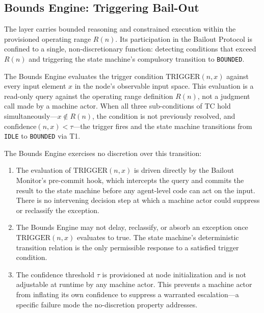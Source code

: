 \subsection{Bounds Engine: Triggering Bail-Out}\label{sec:bounds-trigger}

The \bounds{} layer carries bounded reasoning and constrained execution within the provisioned operating range $R(n)$. Its participation in the Bailout Protocol is confined to a single, non-discretionary function: detecting conditions that exceed $R(n)$ and triggering the state machine's compulsory transition to \texttt{BOUNDED}.

The Bounds Engine evaluates the trigger condition $\text{TRIGGER}(n, x)$ against every input element $x$ in the node's observable input space. This evaluation is a read-only query against the operating range definition $R(n)$, not a judgment call made by a machine actor. When all three sub-conditions of TC hold simultaneously---$x \notin R(n)$, the condition is not previously resolved, and $\text{confidence}(n, x) < \tau$---the trigger fires and the state machine transitions from \texttt{IDLE} to \texttt{BOUNDED} via T1.

The Bounds Engine exercises no discretion over this transition:

\begin{enumerate}\itemsep=0pt
\item The evaluation of $\text{TRIGGER}(n, x)$ is driven directly by the Bailout Monitor's pre-commit hook, which intercepts the query and commits the result to the state machine before any agent-level code can act on the input. There is no intervening decision step at which a machine actor could suppress or reclassify the exception.

\item The Bounds Engine may not delay, reclassify, or absorb an exception once $\text{TRIGGER}(n, x)$ evaluates to true. The state machine's deterministic transition relation is the only permissible response to a satisfied trigger condition.

\item The confidence threshold $\tau$ is provisioned at node initialization and is not adjustable at runtime by any machine actor. This prevents a machine actor from inflating its own confidence to suppress a warranted escalation---a specific failure mode the no-discretion property addresses.
\end{enumerate}

